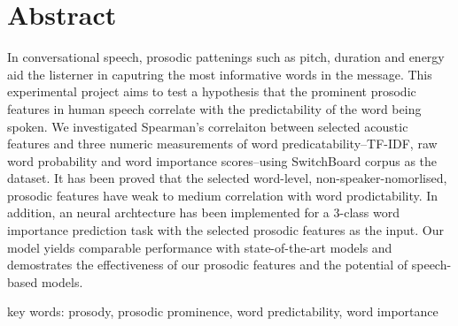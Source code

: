 \chapter*{\Large \center Abstract}


In conversational speech, prosodic pattenings such as pitch, duration and energy aid the listerner in caputring the most informative words in the message.
This experimental project aims to test a hypothesis that the prominent prosodic features in human speech correlate with the predictability of the word being spoken. We investigated Spearman's correlaiton between selected acoustic features and three numeric measurements of word predicatability--TF-IDF, raw word probability and word importance scores--using SwitchBoard corpus as the dataset. It has been proved that the selected word-level, non-speaker-nomorlised, prosodic features have weak to medium correlation with word prodictability. In addition, an neural archtecture has been implemented for a 3-class word importance prediction task with the selected prosodic features as the input. Our model yields comparable performance with state-of-the-art models and demostrates the effectiveness of our prosodic features and the potential of speech-based models.

key words: prosody, prosodic prominence, word predictability, word importance